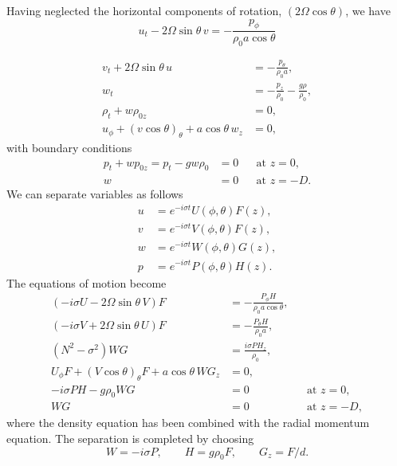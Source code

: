 Having neglected the horizontal components of rotation, $(2\Omega\cos\theta)$, we have
\[
	u_t-2\Omega\sin\theta\,v=-\frac{p_\phi}{\rho_0a\cos\theta}
\]

\sourcepagebreak

\begin{align*}
	v_t+2\Omega\sin\theta\,u                     & =-\frac{p_\theta}{\rho_0a},                \\
	w_t                                          & =-\frac{p_z}{\rho_0}-\frac{g\rho}{\rho_0}, \\
	\rho_t+w\rho_{0z}                            & =0,                                        \\
	u_\phi+(v\cos\theta)_\theta+a\cos\theta\,w_z & =0,
\end{align*}
with boundary conditions
\begin{align*}
	p_t+w p_{0z}=p_t-gw\rho_0 & =0 &  & \text{at }z=0,  \\
	w                         & =0 &  & \text{at }z=-D.
\end{align*}
We can separate variables as follows
\begin{align*}
	u & =e^{-i\sigma t}U(\phi,\theta)F(z), \\
	v & =e^{-i\sigma t}V(\phi,\theta)F(z), \\
	w & =e^{-i\sigma t}W(\phi,\theta)G(z), \\
	p & =e^{-i\sigma t}P(\phi,\theta)H(z).
\end{align*}
The equations of motion become
\begin{align*}
	(-i\sigma U-2\Omega\sin\theta\,V)F
	                                                  & =-\frac{P_\phi H}{\rho_0a\cos\theta},                      \\
	(-i\sigma V+2\Omega\sin\theta\,U)F
	                                                  & =-\frac{P_\theta H}{\rho_0a},                              \\
	(N^2-\sigma^2)WG                                  & =\frac{i\sigma P H_z}{\rho_0},                             \\
	U_\phi F+(V\cos\theta)_\theta F+a\cos\theta\,WG_z & =0,                                                        \\
	-i\sigma PH-g\rho_0WG                             & =0                                    &  & \text{at }z=0,  \\
	WG                                                & =0                                    &  & \text{at }z=-D,
\end{align*}
where the density equation has been combined with the radial momentum equation.
The separation is completed by choosing
\[
	W=-i\sigma P,\qquad H=g\rho_0F,\qquad G_z=F/d.
\]

